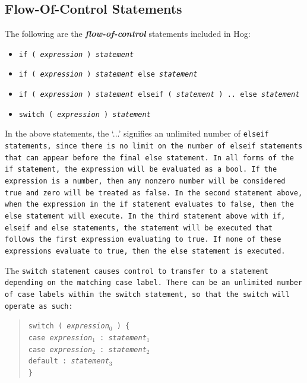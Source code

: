 \documentclass{article}
\begin{document}
\subsection{Flow-Of-Control Statements} %
\label{sub:flow_of_control_statements}

The following are the \textbf{\emph{flow-of-control}} statements included in Hog:

\begin{itemize}
  \item[] \tt if ( \rm \emph{expression} \tt ) \rm \emph{statement}
  \item[] \tt if ( \rm \emph{expression} \tt ) \rm \emph{statement} \tt else \rm \emph{statement}
  \item[] \tt if ( \rm \emph{expression} \tt ) \rm \emph{statement} \tt elseif ( \rm \emph{statement} \tt ) .. else 
  \rm \emph{statement}
  \item[] \tt switch ( \rm \emph{expression} \tt ) \rm \emph{statement} \rm
\end{itemize}

In the above statements, the ‘...’ signifies an unlimited number of \tt elseif \rm
statements, since there is no limit on the number of \tt elseif \rm statements
that can appear before the final \tt else \rm statement. In all forms of the \tt
if \rm statement, the expression will be evaluated as a \tt bool\rm. If the
expression is a number, then any non­zero number will be considered \tt true \rm
and zero will be treated as \tt false\rm. In the second statement above, when the
expression in the \tt if \rm statement evaluates to \tt false\rm, then the \tt
else \rm statement will execute. In the third statement above with \tt if\rm, \tt
elseif \rm and \tt else \rm statements, the statement will be executed that
follows the first expression evaluating to \tt true\rm. If none of these
expressions evaluate to \tt true\rm, then the \tt else \rm statement is executed.

The \tt switch \rm statement causes control to transfer to a statement depending
on the matching \tt case \rm label. There can be an unlimited number of \tt case
\rm labels within the \tt switch \rm statement, so that the \tt switch \rm will
operate as such:

\begin{quotation}
  \tt switch ( \rm \emph{expression}$_0$ \tt ) \{\\
  \indent \indent \tt case \rm \emph{expression}$_1$ \tt : \rm\emph{statement}$_1$ \\
  \indent \indent \tt case \rm \emph{expression}$_2$ \tt : \rm\emph{statement}$_2$ \\
  \indent \indent \tt default : \rm \emph{statement}$_3$ \\
  \indent \tt \}
\end{quotation}
\end{document}
